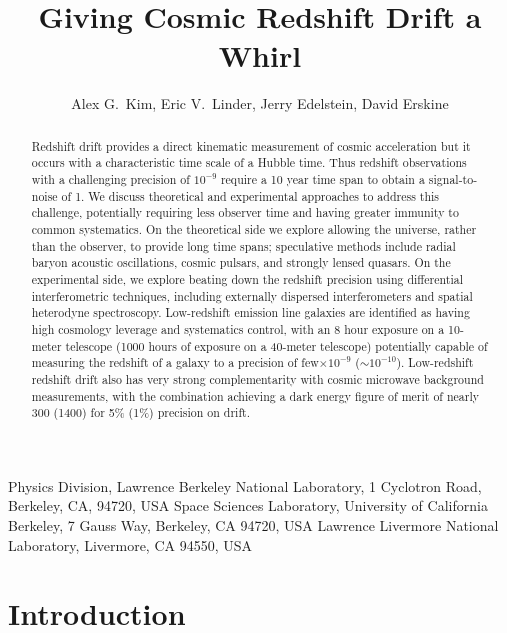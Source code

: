 \documentclass[preprint2, 10pt]{aastex}
\begin{document}
\title{Giving Cosmic Redshift Drift a Whirl} 
\author{Alex G.\ Kim, Eric V.\ Linder, Jerry Edelstein, David Erskine}
{
Physics Division, Lawrence Berkeley National Laboratory, 1 Cyclotron Road, Berkeley, CA, 94720, USA}
{
Space Sciences Laboratory, University of California Berkeley, 7 Gauss Way, Berkeley, CA 94720, USA
}
{
Lawrence Livermore National Laboratory, Livermore,
CA 94550, USA
} 

\begin{abstract} 
Redshift drift provides a direct kinematic measurement of cosmic acceleration 
but it occurs with a characteristic time scale of a Hubble time.  Thus 
redshift observations with a challenging precision of $10^{-9}$ require a 
10 year time span to obtain a signal-to-noise of 1. We discuss theoretical 
and experimental approaches to address this challenge, potentially requiring 
less observer time and having greater immunity to common systematics.  On 
the theoretical side we explore allowing the universe, rather than the 
observer, to provide long time spans; speculative methods include radial 
baryon acoustic oscillations, cosmic pulsars, and strongly lensed quasars. 
On the experimental side, we explore beating down the redshift precision 
using differential interferometric techniques, including externally 
dispersed interferometers and spatial heterodyne spectroscopy. Low-redshift
emission line galaxies are identified as having high cosmology 
leverage and systematics control, with an 8 hour exposure on a 10-meter 
telescope (1000 hours of exposure on a 40-meter telescope) potentially 
capable of measuring the redshift of a galaxy to a precision 
of 
few$\times 10^{-9}$ 
($\sim 10^{-10}$). Low-redshift redshift drift also has very strong 
complementarity with cosmic microwave background measurements, with the 
combination achieving a dark energy figure of merit of nearly 300 (1400) 
for 5\% (1\%) precision on drift. 
\end{abstract}




\section{Introduction} \label{Sec:intro} 
\end{document}
